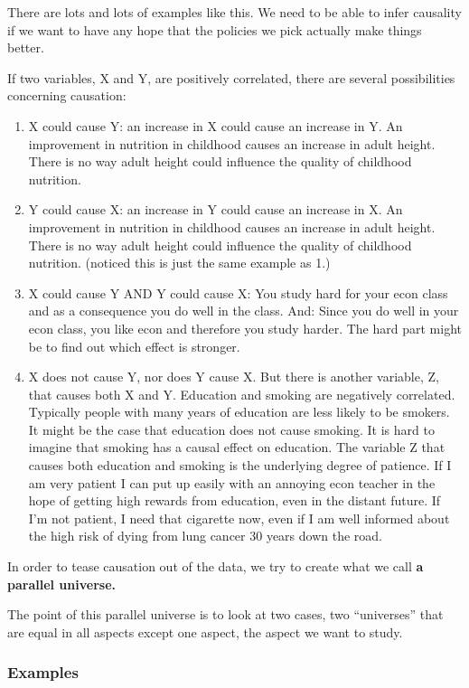 \documentclass[
]{book}
\providecommand{\tightlist}{%
  \setlength{\itemsep}{0pt}\setlength{\parskip}{0pt}}
\begin{document}
There are lots and lots of examples like this. We need to be able to infer causality if we want to have any hope that the policies we pick actually make things better.

If two variables, X and Y, are positively correlated, there are several possibilities concerning causation:

\begin{enumerate}
\def\labelenumi{\arabic{enumi}.}
\tightlist
\item
  X could cause Y: an increase in X could cause an increase in Y. An improvement in nutrition in childhood causes an increase in adult height. There is no way adult height could influence the quality of childhood nutrition.
\item
  Y could cause X: an increase in Y could cause an increase in X. An improvement in nutrition in childhood causes an increase in adult height. There is no way adult height could influence the quality of childhood nutrition. (noticed this is just the same example as 1.)
\item
  X could cause Y AND Y could cause X: You study hard for your econ class and as a consequence you do well in the class. And: Since you do well in your econ class, you like econ and therefore you study harder. The hard part might be to find out which effect is stronger.
\item
  X does not cause Y, nor does Y cause X. But there is another variable, Z, that causes both X and Y. Education and smoking are negatively correlated. Typically people with many years of education are less likely to be smokers. It might be the case that education does not cause smoking. It is hard to imagine that smoking has a causal effect on education. The variable Z that causes both education and smoking is the underlying degree of patience. If I am very patient I can put up easily with an annoying econ teacher in the hope of getting high rewards from education, even in the distant future. If I'm not patient, I need that cigarette now, even if I am well informed about the high risk of dying from lung cancer 30 years down the road.
\end{enumerate}

In order to tease causation out of the data, we try to create what we call {\textbf{a parallel universe.}}

The point of this parallel universe is to look at two cases, two ``universes'' that are equal in all aspects except one aspect, the aspect we want to study.

\hypertarget{examples-1}{%
\subsubsection{Examples}\label{examples-1}}
\end{document}
